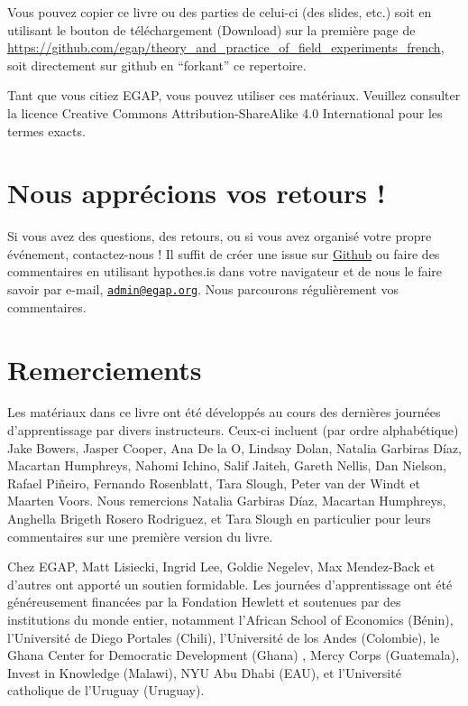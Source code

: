 \documentclass[12pt,]{book}
\begin{document}
Vous pouvez copier ce livre ou des parties de celui-ci (des slides, etc.) soit en utilisant le bouton de téléchargement (Download) sur la première page de \url{https://github.com/egap/theory_and_practice_of_field_experiments_french}, soit directement sur github en ``forkant'' ce repertoire.

Tant que vous citiez EGAP, vous pouvez utiliser ces matériaux. Veuillez consulter la licence Creative Commons Attribution-ShareAlike 4.0 International pour les termes exacts.

\hypertarget{nous-appruxe9cions-vos-retours}{%
\section{Nous apprécions vos retours !}\label{nous-appruxe9cions-vos-retours}}

Si vous avez des questions, des retours, ou si vous avez organisé votre propre événement, contactez-nous !
Il suffit de créer une issue sur \href{https://github.com/egap/theory_and_practice_of_field_experiments_french/issues}{Github} ou faire des commentaires en utilisant hypothes.is dans votre navigateur et de nous le faire savoir par e-mail, \href{mailto:admin@egap.org}{\nolinkurl{admin@egap.org}}. Nous parcourons régulièrement vos commentaires.

\hypertarget{remerciements}{%
\section{Remerciements}\label{remerciements}}

Les matériaux dans ce livre ont été développés au cours des dernières journées d'apprentissage par divers instructeurs.
Ceux-ci incluent (par ordre alphabétique) Jake Bowers, Jasper Cooper, Ana De la O, Lindsay Dolan, Natalia Garbiras Díaz, Macartan Humphreys, Nahomi Ichino, Salif Jaiteh, Gareth Nellis, Dan Nielson, Rafael Piñeiro, Fernando Rosenblatt, Tara Slough, Peter van der Windt et Maarten Voors. Nous remercions Natalia Garbiras Díaz, Macartan Humphreys, Anghella Brigeth Rosero Rodriguez, et Tara Slough en particulier pour leurs commentaires sur une première version du livre.

Chez EGAP, Matt Lisiecki, Ingrid Lee, Goldie Negelev, Max Mendez-Back et d'autres ont apporté un soutien formidable. Les journées d'apprentissage ont été généreusement financées par la Fondation Hewlett et soutenues par des institutions du monde entier, notamment l'African School of Economics (Bénin), l'Université de Diego Portales (Chili), l'Université de los Andes (Colombie), le Ghana Center for Democratic Development (Ghana) , Mercy Corps (Guatemala), Invest in Knowledge (Malawi), NYU Abu Dhabi (EAU), et l'Université catholique de l'Uruguay (Uruguay).
\end{document}
